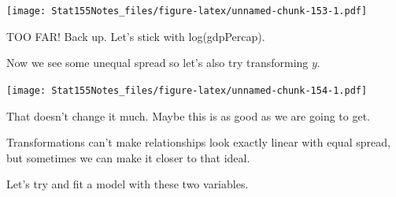 \documentclass[]{book}
\newenvironment{Shaded}{\begin{snugshade}}{\end{snugshade}}
\newcommand{\DataTypeTok}[1]{\textcolor[rgb]{0.13,0.29,0.53}{#1}}
\newcommand{\DecValTok}[1]{\textcolor[rgb]{0.00,0.00,0.81}{#1}}
\newcommand{\KeywordTok}[1]{\textcolor[rgb]{0.13,0.29,0.53}{\textbf{#1}}}
\newcommand{\NormalTok}[1]{#1}
\newcommand{\OperatorTok}[1]{\textcolor[rgb]{0.81,0.36,0.00}{\textbf{#1}}}
\newcommand{\StringTok}[1]{\textcolor[rgb]{0.31,0.60,0.02}{#1}}
\begin{document}
\texttt{[image: Stat155Notes\_files/figure-latex/unnamed-chunk-153-1.pdf]}

TOO FAR! Back up. Let's stick with log(gdpPercap).

Now we see some unequal spread so let's also try transforming \(y\).

\begin{Shaded}
\end{Shaded}

\texttt{[image: Stat155Notes\_files/figure-latex/unnamed-chunk-154-1.pdf]}

That doesn't change it much. Maybe this is as good as we are going to get.

Transformations can't make relationships look exactly linear with equal spread, but sometimes we can make it closer to that ideal.

Let's try and fit a model with these two variables.

\begin{Shaded}
\end{Shaded}
\end{document}
